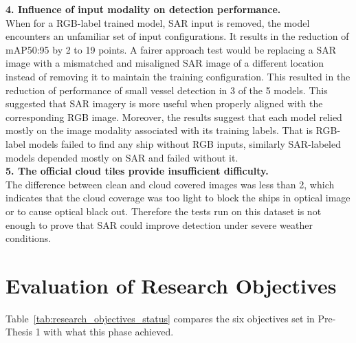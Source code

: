 \noindent\textbf{4. Influence of input modality on detection performance.}\\
When for a RGB-label trained model, SAR input is removed, the model encounters an unfamiliar set of input configurations. It results in the reduction of mAP50:95 by 2 to 19 points. A fairer approach test would be replacing a SAR image with a mismatched and misaligned SAR image of a different location instead of removing it to maintain the training configuration. This resulted in the reduction of performance of small vessel detection in 3 of the 5 models. This suggested that SAR imagery is more useful when properly aligned with the corresponding RGB image. Moreover, the results suggest that each model relied mostly on the image modality associated with its training labels. That is RGB-label models failed to find any ship without RGB inputs, similarly SAR-labeled models depended mostly on SAR and failed without it.\\

\noindent\textbf{5. The official cloud tiles provide insufficient difficulty.}\\
The difference between clean and cloud covered images was less than 2, which indicates that the cloud coverage was too light to block the ships in optical image or to cause optical black out. Therefore the tests run on this dataset is not enough to prove that SAR could improve detection under severe weather conditions. 

\newpage
\section{Evaluation of Research Objectives}
Table~\ref{tab:research_objectives_status} compares the six objectives set in Pre-Thesis 1 with what this phase achieved. \\


